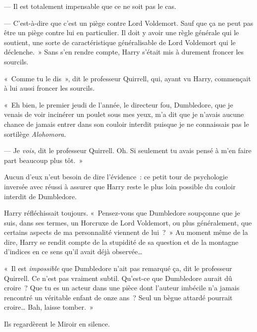 --- Il est totalement impensable que ce ne soit pas le cas.

--- C'est-à-dire que c'est un piège contre Lord Voldemort. Sauf que ça ne peut pas être un piège contre lui en particulier. Il doit y avoir une règle générale qui le soutient, une sorte de caractéristique généralisable de Lord Voldemort qui le déclenche.~» Sans s'en rendre compte, Harry s'était mis à durement froncer les sourcils.

«~Comme tu le dis~», dit le professeur Quirrell, qui, ayant vu Harry, commençait à lui aussi froncer les sourcils.

«~Eh bien, le premier jeudi de l'année, le directeur fou, Dumbledore, que je venais de voir incinérer un poulet sous mes yeux, m'a dit que je n'avais aucune chance de jamais entrer dans son couloir interdit puisque je ne connaissais pas le sortilège \emph{Alohomora}.

--- Je \emph{vois}, dit le professeur Quirrell. Oh. Si seulement tu avais pensé à m'en faire part beaucoup plus tôt.~»

Aucun d'eux n'eut besoin de dire l'évidence~: ce petit tour de psychologie inversée avec réussi à assurer que Harry reste le plus loin possible du couloir interdit de Dumbledore.

Harry réfléchissait toujours. «~Pensez-vous que Dumbledore soupçonne que je suis, dans ses termes, un Horcruxe de Lord Voldemort, ou plus généralement, que certains aspects de ma personnalité viennent de lui~?~» Au moment même de la dire, Harry se rendit compte de la stupidité de sa question et de la montagne d'indices en ce sens qu'il avait déjà observée…

«~Il est \emph{impossible} que Dumbledore n'ait pas remarqué ça, dit le professeur Quirrell. Ce n'est pas vraiment subtil. Qu'est-ce que Dumbledore aurait dû croire~? Que tu es un acteur dans une pièce dont l'auteur imbécile n'a jamais rencontré un véritable enfant de onze ans~? Seul un bègue attardé pourrait croire… Bah, laisse tomber.~»

Ils regardèrent le Miroir en silence.

